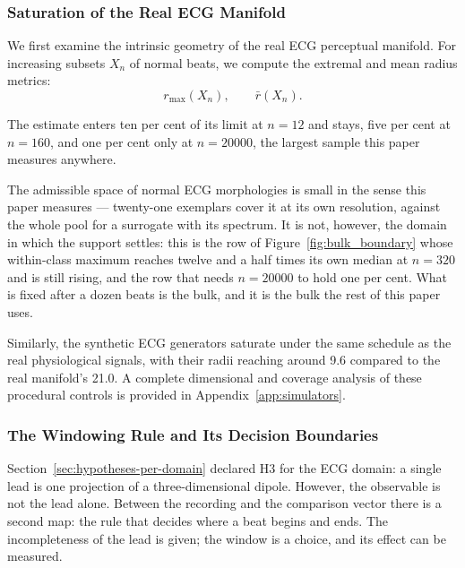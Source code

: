 \documentclass[10pt]{article}
\theoremstyle{plain}
\theoremstyle{definition}
\theoremstyle{remark}
\begin{document}
\subsubsection{Saturation of the Real ECG Manifold}

We first examine the intrinsic geometry of the real ECG perceptual manifold.
For increasing subsets $X_n$ of normal beats, we compute the extremal and mean
radius metrics:
\[
r_{\max}(X_n), \qquad \bar{r}(X_n).
\]

The estimate enters ten per cent of its limit at $n=12$ and stays, five per
cent at $n=160$, and one per cent only at $n=20000$, the largest sample this
paper measures anywhere.

The admissible space of normal ECG morphologies is small in the sense this
paper measures --- twenty-one exemplars cover it at its own resolution, against
the whole pool for a surrogate with its spectrum. It is not, however, the
domain in which the support settles: this is the row of
Figure~\ref{fig:bulk_boundary} whose within-class maximum reaches twelve and a
half times its own median at $n=320$ and is still rising, and the row that
needs $n=20000$ to hold one per cent. What is fixed after a dozen beats is the
bulk, and it is the bulk the rest of this paper uses.




Similarly, the synthetic ECG generators saturate under the same schedule as the real physiological signals, with their radii reaching around 9.6 compared to the real manifold's 21.0. A complete dimensional and coverage analysis of these procedural controls is provided in Appendix~\ref{app:simulators}.

\subsubsection{The Windowing Rule and Its Decision Boundaries}
\label{sec:results-ecg-observable}

Section~\ref{sec:hypotheses-per-domain} declared H3 for the ECG domain: a single lead is one projection of a three-dimensional dipole. However, the observable is not the lead alone. Between the recording and the comparison vector there is a second map: the rule that decides where a beat begins and ends. The incompleteness of the lead is given; the window is a choice, and its effect can be measured.
\end{document}
